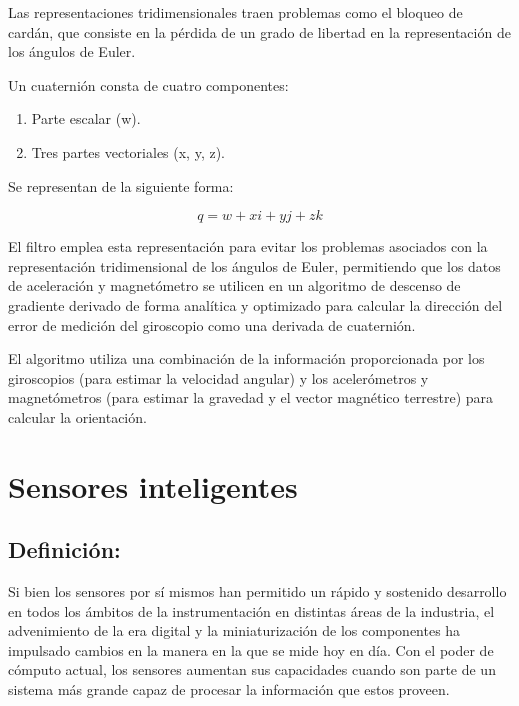 \begin{itemize}
    Las representaciones tridimensionales traen problemas como el bloqueo de cardán, que consiste en la pérdida de un grado de libertad en la representación de los ángulos de Euler.

    Un cuaternión consta de cuatro componentes:

    \begin{enumerate}
        \item Parte escalar (w).
        \item Tres partes vectoriales (x, y, z).
    \end{enumerate}

    Se representan de la siguiente forma:

    \begin{equation}
        q = w + xi + yj + zk
    \end{equation}

    El filtro emplea esta representación para evitar los problemas asociados con la representación tridimensional de los ángulos de Euler, permitiendo que los datos de aceleración y magnetómetro se utilicen en un algoritmo de descenso de gradiente derivado de forma analítica y optimizado para calcular la dirección del error de medición del giroscopio como una derivada de cuaternión.

    El algoritmo utiliza una combinación de la información proporcionada por los giroscopios (para estimar la velocidad angular) y los acelerómetros y magnetómetros (para estimar la gravedad y el vector magnético terrestre) para calcular la orientación.
\end{itemize}

\section{Sensores inteligentes}

\subsection{Definición:}

Si bien los sensores por sí mismos han permitido un rápido y sostenido desarrollo en todos los ámbitos de la instrumentación en distintas áreas de la industria, el advenimiento de la era digital y la miniaturización de los componentes ha impulsado cambios en la manera en la que se mide hoy en día. Con el poder de cómputo actual, los sensores aumentan sus capacidades cuando son parte de un sistema más grande capaz de procesar la información que estos proveen.


